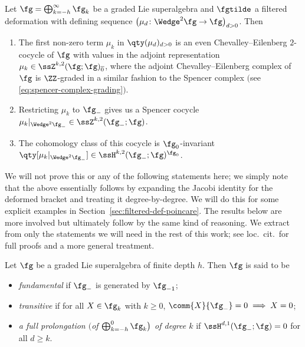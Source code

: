
\begin{Proposition}\label{prop:def-seq-spencer-cocycle}
	Let $\fg=\bigoplus_{k=-h}^\infty\fg_k$ be a graded Lie superalgebra and $\fgtilde$ a filtered deformation with defining sequence $\bigl(\mu_d\colon\Wedge^2\fg\to\fg\bigr)_{d> 0}$. Then
	\begin{enumerate}\itemsep=0pt
		\item[$(1)$] {\rm\cite[\emph{Proposition}~2.1]{Cheng1998}} The first non-zero term $\mu_k$ in $\qty(\mu_d)_{d> 0}$ is an even Chevalley--Eilenberg $2$-cocycle of $\fg$ with values in the adjoint representation
		$\mu_k\in\ssZ^{k,2}(\fg;\fg)_{\overline{0}}$,	
		where the adjoint Chevalley--Eilenberg complex of $\fg$ is $\ZZ$-graded in a similar fashion to the Spencer complex $($see \eqref{eq:spencer-complex-grading}$)$.
		\item[$(2)$] {\rm\cite[\emph{Proposition}~2.2]{Cheng1998}} Restricting $\mu_k$ to $\fg_-$ gives us a Spencer cocycle
		$\mu_k|_{\Wedge^2\fg_-}\in\ssZ^{k,2}(\fg_-;\fg)$.
		\item[$(3)$] {\rm\cite[\emph{Proposition}~2.2]{Cheng1998}} The cohomology class of this cocycle is $\fg_0$-invariant
			$\qty[\mu_k|_{\Wedge^2\fg_-}]\in \ssH^{k,2}(\fg_-;\fg)^{\fg_0}$.
	\end{enumerate}
\end{Proposition}
We will not prove this or any of the following statements here; we simply note that the above essentially follows by expanding the Jacobi identity for the deformed bracket and treating it degree-by-degree. We will do this for some explicit examples in Section~\ref{sec:filtered-def-poincare}. The results below are more involved but ultimately follow by the same kind of reasoning. We extract from \cite{Cheng1998} only the statements we will need in the rest of this work; see loc.\ cit.\ for full proofs and a more general treatment.

\begin{Definition}\label{def:fund-trans-prolong}
	Let $\fg$ be a graded Lie superalgebra of finite depth $h$. Then $\fg$ is said to be
	\begin{itemize}\itemsep=0pt
	\item \emph{fundamental} if $\fg_-$ is generated by $\fg_{-1}$;
	\item \emph{transitive} if for all $X\in\fg_k$ with $k\geq 0$, $\comm{X}{\fg_-}=0\implies X=0$;
	\item \emph{a full prolongation $\big($of $\bigoplus_{k=-h}^0\fg_k\big)$ of degree $k$} if $\ssH^{d,1}(\fg_-;\fg)=0$ for all $d\geq k$.
	\end{itemize}
\end{Definition}

